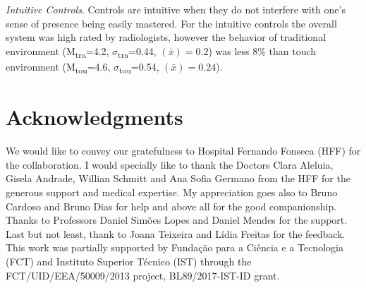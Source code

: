 \documentclass{chi-ext}
\begin{document}
\clearpage
 
\textit{Intuitive Controls}. Controls are intuitive when they do not interfere with one's sense of presence being easily mastered. For the intuitive controls the overall system was high rated by radiologists, however the behavior of traditional environment (M\textsubscript{tra}=4.2, $\sigma$\textsubscript{tra}=0.44, {}$\left({\bar x}\right)=0.2$) was less 8\% than touch environment (M\textsubscript{tou}=4.6, $\sigma$\textsubscript{tou}=0.54, {}$\left({\bar x}\right)=0.24$).

\section{Acknowledgments}

We would like to convey our gratefulness to Hospital Fernando Fonseca (HFF) for the collaboration. I would specially like to thank the Doctors Clara Aleluia, Gisela Andrade, Willian Schmitt and Ana Sofia Germano from the HFF for the generous support and medical expertise. My appreciation goes also to Bruno Cardoso and Bruno Dias for help and above all for the good companionship. Thanks to Professors Daniel Sim\~{o}es Lopes and Daniel Mendes for the support. Last but not least, thank to Joana Teixeira and L\'{i}dia Freitas for the feedback. This work was partially supported by Funda\c{c}\~{a}o para a Ci\^{e}ncia e a Tecnologia (FCT) and Instituto Superior T\'{e}cnico (IST) through the FCT/UID/EEA/50009/2013 project, BL89/2017-IST-ID grant.

\balance


\end{document}

